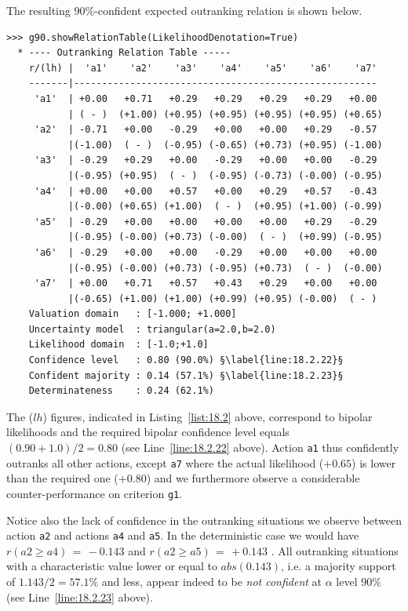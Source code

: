 The resulting $90\%$-confident expected outranking relation is shown below.
\begin{lstlisting}[caption={$90\%$-confident outranking relation with triangular distributed significance weights},label=list:18.2,basicstyle=\ttfamily\scriptsize]
>>> g90.showRelationTable(LikelihoodDenotation=True)
  * ---- Outranking Relation Table -----
    r/(lh) |  'a1'    'a2'    'a3'    'a4'    'a5'    'a6'    'a7'	 
    -------|------------------------------------------------------
     'a1'  | +0.00   +0.71   +0.29   +0.29   +0.29   +0.29   +0.00  
           | ( - )  (+1.00) (+0.95) (+0.95) (+0.95) (+0.95) (+0.65) 
     'a2'  | -0.71   +0.00   -0.29   +0.00   +0.00   +0.29   -0.57  
           |(-1.00)  ( - )  (-0.95) (-0.65) (+0.73) (+0.95) (-1.00) 
     'a3'  | -0.29   +0.29   +0.00   -0.29   +0.00   +0.00   -0.29  
           |(-0.95) (+0.95)  ( - )  (-0.95) (-0.73) (-0.00) (-0.95) 
     'a4'  | +0.00   +0.00   +0.57   +0.00   +0.29   +0.57   -0.43  
       	   |(-0.00) (+0.65) (+1.00)  ( - )  (+0.95) (+1.00) (-0.99) 
     'a5'  | -0.29   +0.00   +0.00   +0.00   +0.00   +0.29   -0.29  
           |(-0.95) (-0.00) (+0.73) (-0.00)  ( - )  (+0.99) (-0.95) 
     'a6'  | -0.29   +0.00   +0.00   -0.29   +0.00   +0.00   +0.00  
           |(-0.95) (-0.00) (+0.73) (-0.95) (+0.73)  ( - )  (-0.00) 
     'a7'  | +0.00   +0.71   +0.57   +0.43   +0.29   +0.00   +0.00  
           |(-0.65) (+1.00) (+1.00) (+0.99) (+0.95) (-0.00)  ( - )  
    Valuation domain   : [-1.000; +1.000] 
    Uncertainty model  : triangular(a=2.0,b=2.0) 
    Likelihood domain  : [-1.0;+1.0] 
    Confidence level   : 0.80 (90.0%) §\label{line:18.2.22}§
    Confident majority : 0.14 (57.1%) §\label{line:18.2.23}§
    Determinateness    : 0.24 (62.1%)
\end{lstlisting}

The ($lh$) figures, indicated in Listing~\ref{list:18.2} above, correspond to bipolar likelihoods and the required bipolar confidence level equals $(0.90+1.0)/2 = 0.80$ (see Line~\ref{line:18.2.22} above). Action \texttt{a1} thus confidently outranks all other actions, except \texttt{a7} where the actual likelihood ($+0.65$) is lower than the required one ($+0.80$) and we furthermore observe a considerable counter-performance on criterion \texttt{g1}.

Notice also the lack of confidence in the outranking situations we observe between action \texttt{a2} and actions \texttt{a4} and \texttt{a5}. In the deterministic case we would have $r(a2 \geqslant a4) \,=\, -0.143$ and $r(a2 \geqslant a5) \,=\, +0.143$ . All outranking situations with a characteristic value lower or equal to $abs(0.143)$, i.e. a majority support of $1.143/2 = 57.1\%$ and less, appear indeed to be \emph{not confident} at $\alpha$ level $90\%$ (see Line~\ref{line:18.2.23} above).

